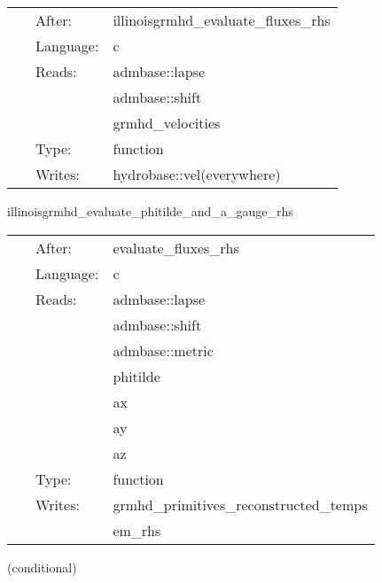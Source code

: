 \documentclass{article}
\begin{document}
\hspace{5mm}{\it convert needed hydrobase variables for nrpyleakage } 


\hspace{5mm}

 \begin{tabular*}{160mm}{cll} 
~ & After:  & illinoisgrmhd\_evaluate\_fluxes\_rhs \\ 
~ & Language:  & c \\ 
~ & Reads:  & admbase::lapse \\ 
~& ~ &admbase::shift\\ 
~& ~ &grmhd\_velocities\\ 
~ & Type:  & function \\ 
~ & Writes:  & hydrobase::vel(everywhere) \\ 
\end{tabular*} 


\vspace{5mm}


\hspace{5mm} illinoisgrmhd\_evaluate\_phitilde\_and\_a\_gauge\_rhs 

\hspace{5mm}{\it evaluate phitilde rhs and gauge contributions to a\_i rhs } 


\hspace{5mm}

 \begin{tabular*}{160mm}{cll} 
~ & After:  & evaluate\_fluxes\_rhs \\ 
~ & Language:  & c \\ 
~ & Reads:  & admbase::lapse \\ 
~& ~ &admbase::shift\\ 
~& ~ &admbase::metric\\ 
~& ~ &phitilde\\ 
~& ~ &ax\\ 
~& ~ &ay\\ 
~& ~ &az\\ 
~ & Type:  & function \\ 
~ & Writes:  & grmhd\_primitives\_reconstructed\_temps \\ 
~& ~ &em\_rhs\\ 
\end{tabular*} 


\vspace{5mm}

   (conditional) 
\end{document}
